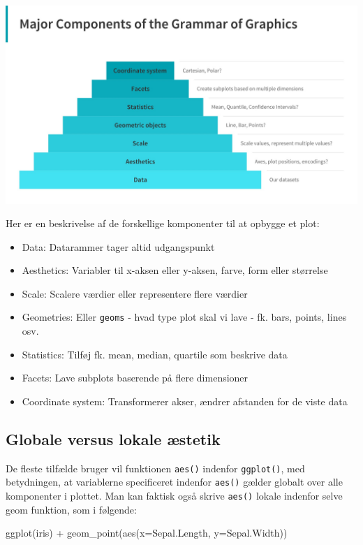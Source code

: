 \documentclass[
]{book}
\newenvironment{Shaded}{\begin{snugshade}}{\end{snugshade}}
\newcommand{\AttributeTok}[1]{\textcolor[rgb]{0.77,0.63,0.00}{#1}}
\newcommand{\FunctionTok}[1]{\textcolor[rgb]{0.00,0.00,0.00}{#1}}
\newcommand{\NormalTok}[1]{#1}
\newcommand{\SpecialCharTok}[1]{\textcolor[rgb]{0.00,0.00,0.00}{#1}}
\providecommand{\tightlist}{%
  \setlength{\itemsep}{0pt}\setlength{\parskip}{0pt}}
\begin{document}
\includegraphics[width=0.5\linewidth]{plots/graphics_grammar}

Her er en beskrivelse af de forskellige komponenter til at opbygge et plot:

\begin{itemize}
\tightlist
\item
  Data: Datarammer tager altid udgangspunkt
\item
  Aesthetics: Variabler til x-aksen eller y-aksen, farve, form eller størrelse
\item
  Scale: Scalere værdier eller representere flere værdier
\item
  Geometries: Eller \texttt{geoms} - hvad type plot skal vi lave - fk. bars, points, lines osv.
\item
  Statistics: Tilføj fk. mean, median, quartile som beskrive data
\item
  Facets: Lave subplots baserende på flere dimensioner
\item
  Coordinate system: Transformerer akser, ændrer afstanden for de viste data
\end{itemize}

\hypertarget{globale-versus-lokale-uxe6stetik}{%
\subsection{Globale versus lokale æstetik}\label{globale-versus-lokale-uxe6stetik}}

De fleste tilfælde bruger vil funktionen \texttt{aes()} indenfor \texttt{ggplot()}, med betydningen, at variablerne specificeret indenfor \texttt{aes()} gælder globalt over alle komponenter i plottet. Man kan faktisk også skrive \texttt{aes()} lokale indenfor selve geom funktion, som i følgende:

\begin{Shaded}
\begin{Highlighting}[]
\FunctionTok{ggplot}\NormalTok{(iris) }\SpecialCharTok{+}
  \FunctionTok{geom\_point}\NormalTok{(}\FunctionTok{aes}\NormalTok{(}\AttributeTok{x=}\NormalTok{Sepal.Length, }\AttributeTok{y=}\NormalTok{Sepal.Width))}
\end{Highlighting}
\end{Shaded}
\end{document}
